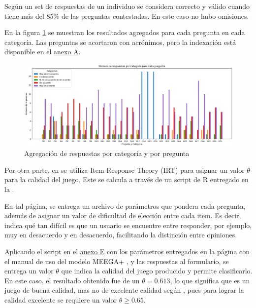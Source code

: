 Según \cite{meegaplus} un set de respuestas de un individuo se considera correcto y válido cuando tiene más del 85\% de las preguntas contestadas. En este caso no hubo omisiones.

En la figura \ref{RespuestasAgregadas} se muestran los resultados agregados para cada pregunta en cada categoría. Las preguntas se acortaron con acrónimos, pero la indexación está disponible en el \hyperref[AnexoA]{anexo A}.

\begin{figure}[h]
	\centering
	\includegraphics[scale=.45]{imagenes/answers.png}
	\caption{Agregación de respuestas por categoría y por pregunta}
	\label{RespuestasAgregadas}
\end{figure}

Por otra parte, en \cite{meegaplus} se utiliza Item Response Theory (IRT) para asignar un valor $\theta$ para la calidad del juego. Este se calcula a través de un script de R entregado en la \href{http://www.gqs.ufsc.br/quality-evaluation/meega-plus/}{} \cite{meegaplusQualityEvaluationPage}.

En tal página, se entrega un archivo de parámetros que pondera cada pregunta, además de asignar un valor de dificultad de elección entre cada item. Es decir, indica qué tan difícil es que un usuario se encuentre entre responder, por ejemplo, muy en desacuerdo y en desacuerdo, facilitando la distinción entre opiniones.

Aplicando el script en el \hyperref[AnexoE]{anexo E} con los parámetros entregados en la página con el manual de uso del modelo MEEGA+ \cite{meegaplusQualityEvaluationPage}, y las respuestas al formulario, se entrega un valor $\theta$ que indica la calidad del juego producido y permite clasificarlo. En este caso, el resultado obtenido fue de un $\theta = 0.613$, lo que significa que es un juego de buena calidad, mas no de excelente calidad según \cite{meegaplus}, pues para lograr la calidad excelente se requiere un valor $\theta \geq 0.65$.

